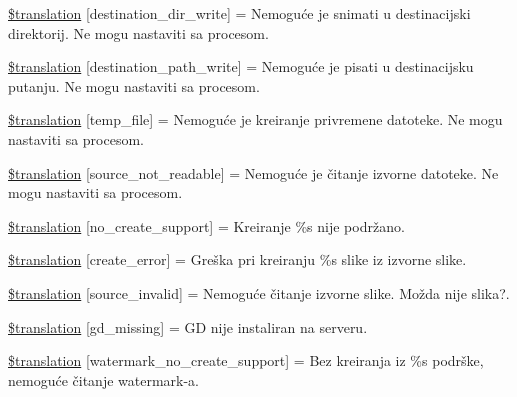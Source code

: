 \begin{DoxyCompactItemize}
\item 
\hyperlink{class_8upload_8hr___h_r_8php_a97608ea194a616db49141a0e6dee900c}{\$translation} \mbox{[}\textquotesingle{}destination\+\_\+dir\+\_\+write\textquotesingle{}\mbox{]} = \textquotesingle{}Nemoguće je snimati u destinacijski direktorij. Ne mogu nastaviti sa procesom.\textquotesingle{}
\item 
\hyperlink{class_8upload_8hr___h_r_8php_a40e4e1962226b89fd76da5819a9602b0}{\$translation} \mbox{[}\textquotesingle{}destination\+\_\+path\+\_\+write\textquotesingle{}\mbox{]} = \textquotesingle{}Nemoguće je pisati u destinacijsku putanju. Ne mogu nastaviti sa procesom.\textquotesingle{}
\item 
\hyperlink{class_8upload_8hr___h_r_8php_a2baece8da11e20d45175db91851ec3e3}{\$translation} \mbox{[}\textquotesingle{}temp\+\_\+file\textquotesingle{}\mbox{]} = \textquotesingle{}Nemoguće je kreiranje privremene datoteke. Ne mogu nastaviti sa procesom.\textquotesingle{}
\item 
\hyperlink{class_8upload_8hr___h_r_8php_a922967ca2df0efdd455261142d8e5715}{\$translation} \mbox{[}\textquotesingle{}source\+\_\+not\+\_\+readable\textquotesingle{}\mbox{]} = \textquotesingle{}Nemoguće je čitanje izvorne datoteke. Ne mogu nastaviti sa procesom.\textquotesingle{}
\item 
\hyperlink{class_8upload_8hr___h_r_8php_a346dfd1ade29f583dd20d345c436859f}{\$translation} \mbox{[}\textquotesingle{}no\+\_\+create\+\_\+support\textquotesingle{}\mbox{]} = \textquotesingle{}Kreiranje \%s nije podržano.\textquotesingle{}
\item 
\hyperlink{class_8upload_8hr___h_r_8php_a53013ce9255c4e1849098ddd9fdb2b3f}{\$translation} \mbox{[}\textquotesingle{}create\+\_\+error\textquotesingle{}\mbox{]} = \textquotesingle{}Greška pri kreiranju \%s slike iz izvorne slike.\textquotesingle{}
\item 
\hyperlink{class_8upload_8hr___h_r_8php_a6ab0a660b457eaf2d3434b225449fdd6}{\$translation} \mbox{[}\textquotesingle{}source\+\_\+invalid\textquotesingle{}\mbox{]} = \textquotesingle{}Nemoguće čitanje izvorne slike. Možda nije slika?.\textquotesingle{}
\item 
\hyperlink{class_8upload_8hr___h_r_8php_a7f3dfcc0db4bbc0f2e7210c439798e56}{\$translation} \mbox{[}\textquotesingle{}gd\+\_\+missing\textquotesingle{}\mbox{]} = \textquotesingle{}G\+D nije instaliran na serveru.\textquotesingle{}
\item 
\hyperlink{class_8upload_8hr___h_r_8php_a82d5853430ab72dc1f9799ec36144cc6}{\$translation} \mbox{[}\textquotesingle{}watermark\+\_\+no\+\_\+create\+\_\+support\textquotesingle{}\mbox{]} = \textquotesingle{}Bez kreiranja iz \%s podrške, nemoguće čitanje watermark-\/a.\textquotesingle{}

\end{DoxyCompactItemize}
